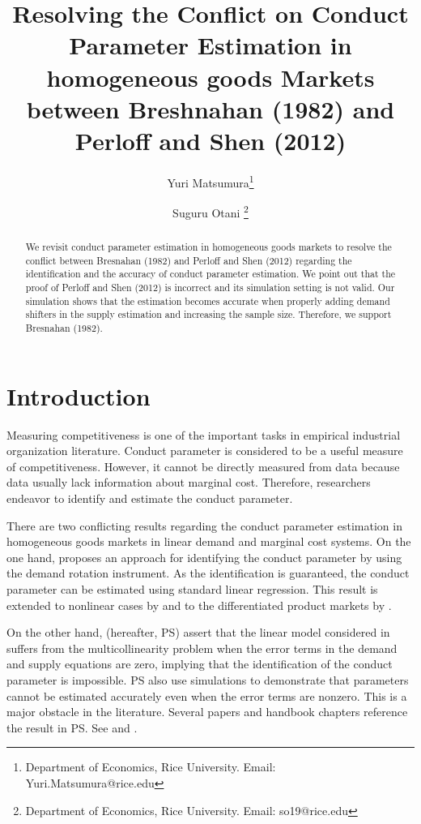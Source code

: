 \documentclass[11pt, a4paper]{article}
\title{Resolving the Conflict on Conduct Parameter Estimation in homogeneous goods Markets between Breshnahan (1982) and Perloff and Shen (2012)}
\author{Yuri Matsumura\thanks{Department of Economics, Rice University. Email: Yuri.Matsumura@rice.edu} \and Suguru Otani \thanks{Department of Economics, Rice University. Email: so19@rice.edu
}}
\begin{document}
\maketitle
\begin{abstract}
    We revisit conduct parameter estimation in homogeneous goods markets to resolve the conflict between Bresnahan (1982) and Perloff and Shen (2012) regarding the identification and the accuracy of conduct parameter estimation. We point out that the proof of Perloff and Shen (2012) is incorrect and its simulation setting is not valid. Our simulation shows that the estimation becomes accurate when properly adding demand shifters in the supply estimation and increasing the sample size. Therefore, we support Bresnahan (1982).
\end{abstract}


\section{Introduction}
Measuring competitiveness is one of the important tasks in empirical industrial organization literature.
Conduct parameter is considered to be a useful measure of competitiveness. 
However, it cannot be directly measured from data because data usually lack information about marginal cost.
Therefore, researchers endeavor to identify and estimate the conduct parameter.

There are two conflicting results regarding the conduct parameter estimation in homogeneous goods markets in linear demand and marginal cost systems.
On the one hand, \citet{bresnahan1982oligopoly} proposes an approach for identifying the conduct parameter by using the demand rotation instrument.
As the identification is guaranteed, the conduct parameter can be estimated using standard linear regression.
This result is extended to nonlinear cases by \citet{lau1982identifying}
and to the differentiated product markets by  \citet{nevoIdentificationOligopolySolution1998}.


On the other hand, \citet{perloff2012collinearity} (hereafter, PS) assert that the linear model considered in \citet{bresnahan1982oligopoly} suffers from the multicollinearity problem when the error terms in the demand and supply equations are zero, implying that the identification of the conduct parameter is impossible.
PS also use simulations to demonstrate that parameters cannot be estimated accurately even when the error terms are nonzero. 
This is a major obstacle in the literature. 
Several papers and handbook chapters reference the result in PS. See \citet{claessensWhatDrivesBank2004, coccoreseMultimarketContactCompetition2013, coccoreseWhatAffectsBank2021, garciaMarketStructuresProduction2020, kumbhakarNewMethodEstimating2012, perekhozhukRegionalLevelAnalysisOligopsony2015} and \citet{shafferMarketPowerCompetition2017}.
\end{document}
